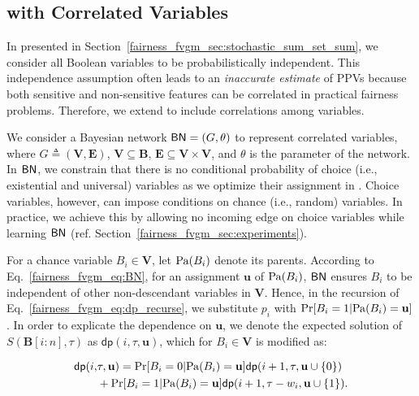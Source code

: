 	
\subsection{{\stochastic} with Correlated Variables} 
\label{sec:dp_with_BN}
In {\stochastic} presented in Section~\ref{fairness_fvgm_sec:stochastic_sum_set_sum}, we consider all  Boolean variables to be probabilistically independent. This independence assumption often leads to an \textit{inaccurate estimate} of PPVs because both sensitive and non-sensitive features can be correlated in practical fairness problems. Therefore, we extend {\stochastic} to include correlations among variables.

We consider a Bayesian network $ \mathsf{BN} = (G, \theta) $ to represent correlated variables, where $ G \triangleq (\mathbf{V}, \mathbf{E}) $, $ \mathbf{V} \subseteq \mathbf{B} $, $ \mathbf{E} \subseteq \mathbf{V} \times \mathbf{V}  $, and $ \theta $ is the parameter of the network.  In  $ \mathsf{BN} $, we constrain that there is no conditional probability of choice (i.e., existential and universal) variables as we optimize their assignment in {\stochastic}. Choice variables, however, can impose conditions on chance (i.e., random) variables. In practice, we achieve this by allowing no incoming edge on choice variables while learning $ \mathsf{BN} $ (ref. Section~\ref{fairness_fvgm_sec:experiments}).
   	
   	

For a chance variable $ B_i \in \mathbf{V} $, let $ \mathrm{Pa}(B_i) $ denote its parents. According to Eq.~\eqref{fairness_fvgm_eq:BN},  for an assignment $ \mathbf{u} $ of $ \mathrm{Pa}(B_i) $, $ \mathsf{BN} $ ensures $ B_i $ to be independent of other non-descendant variables in $ \mathbf{V} $. Hence, in the recursion of Eq.~\eqref{fairness_fvgm_eq:dp_recurse}, we substitute  $ p_i $  with  $ \Pr[B_i = 1| \mathrm{Pa}(B_i) = \mathbf{u}] $. In order to explicate the dependence on $ \mathbf{u} $, we denote the expected solution of $ S(\mathbf{B}[i:n], \tau) $ as 
$ \mathsf{dp}(i, \tau, \mathbf{u}) $, which for $ B_i \in \mathbf{V} $ is modified as:

\begin{align*}
	\mathsf{dp}(i,  &\tau, \mathbf{u}) = \Pr[B_i = 0| \mathrm{Pa}(B_i) = \mathbf{u}] \mathsf{dp}(i+1, \tau, \mathbf{u} \cup \{0\})  \\
	& + \Pr[B_i = 1| \mathrm{Pa}(B_i) = \mathbf{u}]  \mathsf{dp}(i+1, \tau-w_i, \mathbf{u} \cup \{1\}).
\end{align*}

